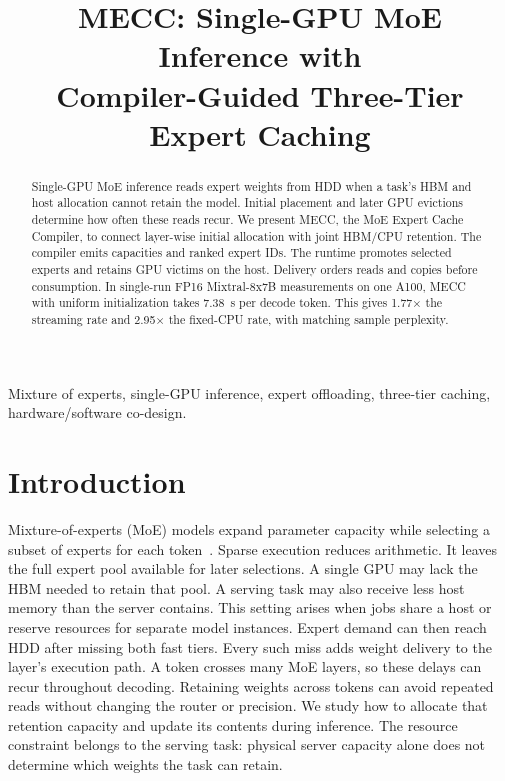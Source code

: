 \documentclass[conference,9pt,letterpaper]{IEEEtran}
\title{MECC: Single-GPU MoE Inference with\protect\\Compiler-Guided Three-Tier Expert Caching}
\author{}
\begin{document}
\maketitle\raggedbottom
\begin{abstract}
Single-GPU MoE inference reads expert weights from HDD when a task's HBM and host allocation cannot retain the model. Initial placement and later GPU evictions determine how often these reads recur. We present MECC, the MoE Expert Cache Compiler, to connect layer-wise initial allocation with joint HBM/CPU retention. The compiler emits capacities and ranked expert IDs. The runtime promotes selected experts and retains GPU victims on the host. Delivery orders reads and copies before consumption. In single-run FP16 Mixtral-8x7B measurements on one A100, MECC with uniform initialization takes 7.38~s per decode token. This gives 1.77$\times$ the streaming rate and 2.95$\times$ the fixed-CPU rate, with matching sample perplexity.
\end{abstract}

\begin{IEEEkeywords}
Mixture of experts, single-GPU inference, expert offloading, three-tier caching, hardware/software co-design.
\end{IEEEkeywords}

\section{Introduction}
Mixture-of-experts (MoE) models expand parameter capacity while selecting a subset of experts for each token~\cite{shazeer,switch,mixtral,deepseekmoe}. Sparse execution reduces arithmetic. It leaves the full expert pool available for later selections. A single GPU may lack the HBM needed to retain that pool. A serving task may also receive less host memory than the server contains. This setting arises when jobs share a host or reserve resources for separate model instances. Expert demand can then reach HDD after missing both fast tiers. Every such miss adds weight delivery to the layer's execution path. A token crosses many MoE layers, so these delays can recur throughout decoding. Retaining weights across tokens can avoid repeated reads without changing the router or precision. We study how to allocate that retention capacity and update its contents during inference. The resource constraint belongs to the serving task: physical server capacity alone does not determine which weights the task can retain.
\end{document}
